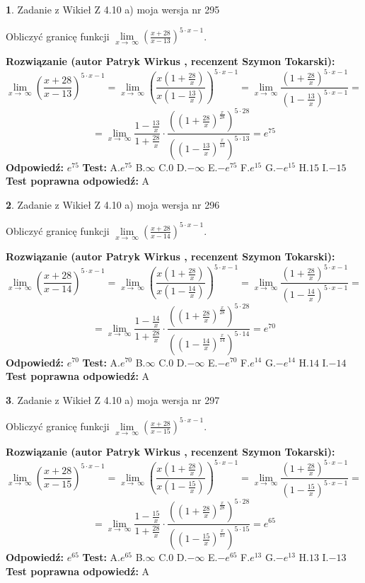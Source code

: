 \documentclass[12pt, a4paper]{article}
\theoremstyle{definition} %
\newtheorem{zad}{}
\newcommand{\zadStart}[1]{\begin{zad}#1\newline}
\newcommand{\zadStop}{\end{zad}}
\newcommand{\rozwStart}[2]{\noindent \textbf{Rozwiązanie (autor #1 , recenzent #2): }\newline}
\newcommand{\rozwStop}{\newline}
\newcommand{\odpStart}{\noindent \textbf{Odpowiedź:}\newline}
\newcommand{\odpStop}{\newline}
\newcommand{\testStart}{\noindent \textbf{Test:}\newline}
\newcommand{\testStop}{\newline}
\newcommand{\kluczStart}{\noindent \textbf{Test poprawna odpowiedź:}\newline}
\newcommand{\kluczStop}{\newline}
\begin{document}
\zadStart{Zadanie z Wikieł Z 4.10 a) moja wersja nr 295}

Obliczyć granicę funkcji  $\lim\limits_{x\to\ \infty}(\frac{x+28}{x-13})^{5\cdot x-1}$.
\zadStop
\rozwStart{Patryk Wirkus}{Szymon Tokarski}
$$\lim\limits_{x\to\ \infty}(\frac{x+28}{x-13})^{5\cdot x-1} = \lim\limits_{x\to\ \infty}(\frac{x(1+\frac{28}{x})}{x(1-\frac{13}{x})})^{5\cdot x-1}=\lim\limits_{x\to\ \infty}\frac{(1+\frac{28}{x})^{5\cdot x-1}}{(1-\frac{13}{x})^{5\cdot x-1}}=$$
$$=\lim\limits_{x\to\ \infty}\frac{1-\frac{13}{x}}{1+\frac{28}{x}}\cdot\frac{((1+\frac{28}{x})^{\frac{x}{28}})^{5\cdot28}}{((1-\frac{13}{x})^{\frac{x}{13}})^{5\cdot13}}=e^{75}$$
\rozwStop
\odpStart
$e^{75}$
\odpStop
\testStart
A.$e^{75}$ B.$\infty$ C.$0$ D.$-\infty$ E.$-e^{75}$
F.$e^{15}$ G.$-e^{15}$
H.$15$
I.$-15$
\testStop
\kluczStart
A
\kluczStop



\zadStart{Zadanie z Wikieł Z 4.10 a) moja wersja nr 296}

Obliczyć granicę funkcji  $\lim\limits_{x\to\ \infty}(\frac{x+28}{x-14})^{5\cdot x-1}$.
\zadStop
\rozwStart{Patryk Wirkus}{Szymon Tokarski}
$$\lim\limits_{x\to\ \infty}(\frac{x+28}{x-14})^{5\cdot x-1} = \lim\limits_{x\to\ \infty}(\frac{x(1+\frac{28}{x})}{x(1-\frac{14}{x})})^{5\cdot x-1}=\lim\limits_{x\to\ \infty}\frac{(1+\frac{28}{x})^{5\cdot x-1}}{(1-\frac{14}{x})^{5\cdot x-1}}=$$
$$=\lim\limits_{x\to\ \infty}\frac{1-\frac{14}{x}}{1+\frac{28}{x}}\cdot\frac{((1+\frac{28}{x})^{\frac{x}{28}})^{5\cdot28}}{((1-\frac{14}{x})^{\frac{x}{14}})^{5\cdot14}}=e^{70}$$
\rozwStop
\odpStart
$e^{70}$
\odpStop
\testStart
A.$e^{70}$ B.$\infty$ C.$0$ D.$-\infty$ E.$-e^{70}$
F.$e^{14}$ G.$-e^{14}$
H.$14$
I.$-14$
\testStop
\kluczStart
A
\kluczStop



\zadStart{Zadanie z Wikieł Z 4.10 a) moja wersja nr 297}

Obliczyć granicę funkcji  $\lim\limits_{x\to\ \infty}(\frac{x+28}{x-15})^{5\cdot x-1}$.
\zadStop
\rozwStart{Patryk Wirkus}{Szymon Tokarski}
$$\lim\limits_{x\to\ \infty}(\frac{x+28}{x-15})^{5\cdot x-1} = \lim\limits_{x\to\ \infty}(\frac{x(1+\frac{28}{x})}{x(1-\frac{15}{x})})^{5\cdot x-1}=\lim\limits_{x\to\ \infty}\frac{(1+\frac{28}{x})^{5\cdot x-1}}{(1-\frac{15}{x})^{5\cdot x-1}}=$$
$$=\lim\limits_{x\to\ \infty}\frac{1-\frac{15}{x}}{1+\frac{28}{x}}\cdot\frac{((1+\frac{28}{x})^{\frac{x}{28}})^{5\cdot28}}{((1-\frac{15}{x})^{\frac{x}{15}})^{5\cdot15}}=e^{65}$$
\rozwStop
\odpStart
$e^{65}$
\odpStop
\testStart
A.$e^{65}$ B.$\infty$ C.$0$ D.$-\infty$ E.$-e^{65}$
F.$e^{13}$ G.$-e^{13}$
H.$13$
I.$-13$
\testStop
\kluczStart
A
\kluczStop
\end{document}
